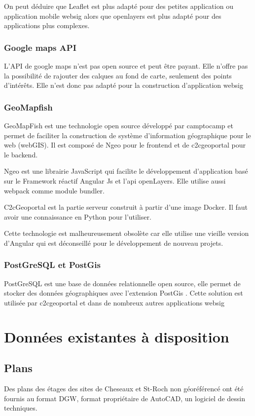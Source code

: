 \documentclass[
    iai, %
    il, %
]{heig-tb}
\begin{document}
On peut déduire que Leaflet est plus adapté pour des petites application ou application mobile \gls{websig} alors que openlayers est plus adapté pour des applications plus complexes.

\subsubsection{Google maps API}
L'API de google maps \cite{google-maps} n'est pas open source et peut être payant.
Elle n'offre pas la possibilité de rajouter des calques au fond de carte, seulement des points d'intérêts.
Elle n'est donc pas adapté pour la construction d'application \gls{websig}

\subsubsection{GeoMapfish}
GeoMapFish est une technologie open source développé par camptocamp et permet de faciliter la construction de système d'information géographique pour le web (webGIS).
Il est composé de Ngeo pour le frontend \cite{ngeo} et de c2cgeoportal \cite{c2cgeoportal} pour le backend.

Ngeo est une librairie JavaScript qui facilite le développement d'application basé sur le Framework réactif Angular Js et l'api openLayers.
Elle utilise aussi webpack comme module bundler.

C2cGeoportal est la partie serveur construit à partir d'une image Docker. Il faut avoir une connaissance en Python pour l'utiliser.

Cette technologie est malheureusement obsolète car elle utilise une vieille version d'Angular qui est déconseillé pour le développement de nouveau projets.

\subsubsection{PostGreSQL et PostGis}
PostGreSQL est une base de données relationnelle open source, elle permet de stocker des données géographiques avec l'extension PostGis  \cite{postgis}.
Cette solution est utilisée par c2cgeoportal et dans de nombreux autres applications \gls{websig}

\section{Données existantes à disposition}
\subsection{Plans}
Des plans des étages des sites de Cheseaux et St-Roch non géoréférencé ont été fournis au format DGW, format propriétaire de AutoCAD, un logiciel de dessin techniques.
\end{document}
